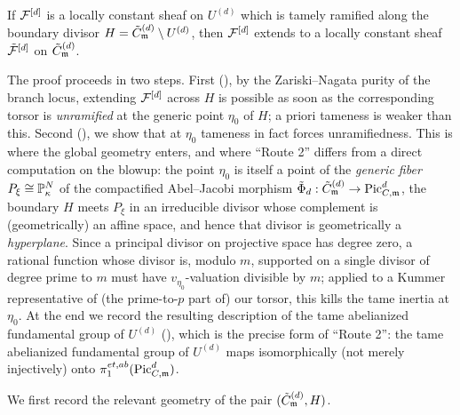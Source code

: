 \begin{lemma}\label{lemma:ExtensionOfTamelyRamifiedSheafRouteTwo}
    If $\cF^{[d]}$ is a locally constant sheaf on $U^{(d)}$ which is tamely ramified along the
    boundary divisor $H = \tilde{C}^{(d)}_\mdls \setminus U^{(d)}$,
    then $\cF^{[d]}$ extends to a locally constant sheaf $\tilde{\cF}^{[d]}$ on
    $\tilde{C}^{(d)}_\mdls$.
\end{lemma}

The proof proceeds in two steps. First
(), by the Zariski--Nagata purity of the branch locus,
extending $\cF^{[d]}$ across $H$ is possible as soon as the corresponding torsor is
\emph{unramified} at the generic point $\eta_0$ of $H$; a priori tameness is weaker than this.
Second (), we show that at $\eta_0$ tameness
in fact forces unramifiedness. This is where the global geometry enters, and where ``Route 2''
differs from a direct computation on the blowup: the point $\eta_0$ is itself a point of the
\emph{generic fiber} $P_\xi \cong \bP^N_\kappa$ of the compactified Abel--Jacobi morphism
$\tilde{\Phi}_d : \Cmod{d} \to \PicCm[d]$, the boundary $H$ meets $P_\xi$ in an irreducible
divisor whose complement is (geometrically) an affine space, and hence that divisor is
geometrically a \emph{hyperplane}. Since a principal divisor on projective space has degree
zero, a rational function whose divisor is, modulo $m$, supported on a single divisor of
degree prime to $m$ must have $v_{\eta_0}$-valuation divisible by $m$; applied to a Kummer
representative of (the prime-to-$p$ part of) our torsor, this kills the tame inertia at
$\eta_0$. At the end we record the resulting description of the tame abelianized fundamental
group of $U^{(d)}$ (), which is the precise form of ``Route 2'':
the tame abelianized fundamental group of $U^{(d)}$ maps isomorphically (not merely
injectively) onto $\pi_1^{et, ab}(\PicCm[d])$.

We first record the relevant geometry of the pair $(\Cmod{d}, H)$.

